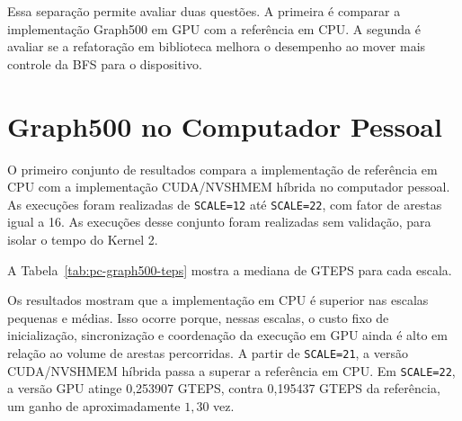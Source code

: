 Essa separação permite avaliar duas questões. A primeira é comparar a
implementação Graph500 em GPU com a referência em CPU. A segunda é avaliar se a
refatoração em biblioteca melhora o desempenho ao mover mais controle da BFS para
o dispositivo.

\section{Graph500 no Computador Pessoal}

O primeiro conjunto de resultados compara a implementação de referência em CPU
com a implementação CUDA/NVSHMEM híbrida no computador pessoal. As execuções
foram realizadas de \texttt{SCALE=12} até \texttt{SCALE=22}, com fator de arestas
igual a 16. As execuções desse conjunto foram realizadas sem validação, para
isolar o tempo do Kernel 2.

A Tabela~\ref{tab:pc-graph500-teps} mostra a mediana de GTEPS para cada escala.

\begin{table}[H]
\centering
{}
\caption{Mediana de GTEPS no computador pessoal para a referência em CPU e a versão CUDA/NVSHMEM híbrida.}
\label{tab:pc-graph500-teps}
\end{table}

Os resultados mostram que a implementação em CPU é superior nas escalas pequenas
e médias. Isso ocorre porque, nessas escalas, o custo fixo de inicialização,
sincronização e coordenação da execução em GPU ainda é alto em relação ao volume
de arestas percorridas. A partir de \texttt{SCALE=21}, a versão CUDA/NVSHMEM
híbrida passa a superar a referência em CPU. Em \texttt{SCALE=22}, a versão GPU
atinge 0,253907 GTEPS, contra 0,195437 GTEPS da referência, um ganho de
aproximadamente $1{,}30$ vez.

